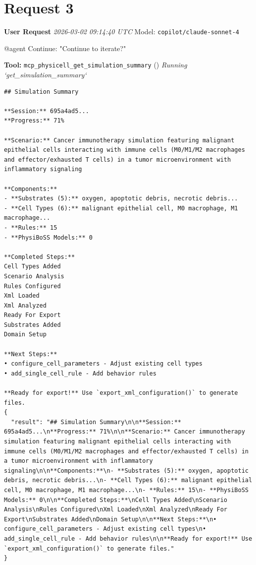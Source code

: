 \documentclass[11pt,a4paper]{article}
\begin{document}
\section{Request 3}
\begin{userbox}
\textbf{User Request}
\quad \textit{2026-03-02 09:14:40 UTC}
\quad Model: \texttt{copilot/claude-sonnet-4}

@agent Continue: "Continue to iterate?"

\end{userbox}
\begin{toolokbox}
\textbf{Tool:} \texttt{mcp\_physicell\_get\_simulation\_summary} (\checkmark)
\textit{Running `get\_simulation\_summary`}
\begin{lstlisting}
## Simulation Summary

**Session:** 695a4ad5...
**Progress:** 71%

**Scenario:** Cancer immunotherapy simulation featuring malignant epithelial cells interacting with immune cells (M0/M1/M2 macrophages and effector/exhausted T cells) in a tumor microenvironment with inflammatory signaling

**Components:**
- **Substrates (5):** oxygen, apoptotic debris, necrotic debris...
- **Cell Types (6):** malignant epithelial cell, M0 macrophage, M1 macrophage...
- **Rules:** 15
- **PhysiBoSS Models:** 0

**Completed Steps:**
Cell Types Added
Scenario Analysis
Rules Configured
Xml Loaded
Xml Analyzed
Ready For Export
Substrates Added
Domain Setup

**Next Steps:**
• configure_cell_parameters - Adjust existing cell types
• add_single_cell_rule - Add behavior rules

**Ready for export!** Use `export_xml_configuration()` to generate files.
{
  "result": "## Simulation Summary\n\n**Session:** 695a4ad5...\n**Progress:** 71%\n\n**Scenario:** Cancer immunotherapy simulation featuring malignant epithelial cells interacting with immune cells (M0/M1/M2 macrophages and effector/exhausted T cells) in a tumor microenvironment with inflammatory signaling\n\n**Components:**\n- **Substrates (5):** oxygen, apoptotic debris, necrotic debris...\n- **Cell Types (6):** malignant epithelial cell, M0 macrophage, M1 macrophage...\n- **Rules:** 15\n- **PhysiBoSS Models:** 0\n\n**Completed Steps:**\nCell Types Added\nScenario Analysis\nRules Configured\nXml Loaded\nXml Analyzed\nReady For Export\nSubstrates Added\nDomain Setup\n\n**Next Steps:**\n• configure_cell_parameters - Adjust existing cell types\n• add_single_cell_rule - Add behavior rules\n\n**Ready for export!** Use `export_xml_configuration()` to generate files."
}
\end{lstlisting}
\end{toolokbox}
\end{document}

